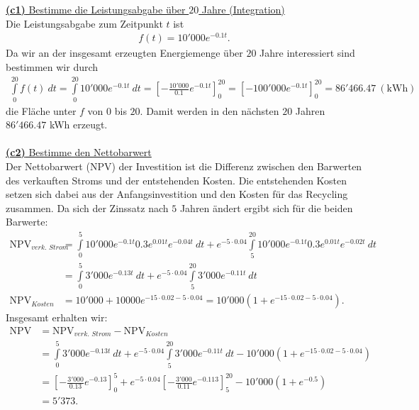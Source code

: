 \underline{\textbf{(c1)} Bestimme die Leistungsabgabe über $20$ Jahre (Integration)}\\
Die Leistungsabgabe zum Zeitpunkt $t$ ist 
\begin{align*}
	f(t) = 10'000 e^{-0.1 t}.
\end{align*}
Da wir an der insgesamt erzeugten Energiemenge über $20$ Jahre interessiert sind bestimmen wir durch
\begin{align*}
	\int 
	\limits_{0}^{20}
	f(t)
	\ dt 
	= 
	\int 
	\limits_{0}^{20}
	10'000 e^{-0.1 t}
	\ dt 
	= 
	\left[-\frac{10'000}{0.1} e^{-0.1 t}\right]_0^20
	= 
	\left[-100'000 e^{-0.1 t}\right]_0^20
	= 
	86'466.47 \ \mathrm{(kWh)}
\end{align*}
die Fläche unter $f$ von $0$ bis $20$.
Damit werden in den nächsten $20$ Jahren $86'466.47 $ kWh erzeugt.\\
\\
\newpage
\underline{\textbf{(c2)} Bestimme den Nettobarwert}\\
Der Nettobarwert ($\mathrm{NPV}$) der Investition ist die Differenz zwischen den Barwerten des verkauften Stroms und der entstehenden Kosten.
Die entstehenden Kosten setzen sich dabei aus der Anfangsinvestition und den Kosten für das Recycling zusammen.
Da sich der Zinssatz nach $5$ Jahren ändert ergibt sich für die beiden Barwerte:
\begin{align*}
	\mathrm{NPV}_{\textit{verk. Strom}}
	&=
	\int \limits_{0}^5 
	10'000 e^{-0.1 t} 0.3 e^{0.01t} e^{-0.04t} \ dt
	+
	e^{-5 \cdot 0.04}
	\int \limits_{5}^{20}
	10'000 e^{-0.1 t} 0.3 e^{0.01t} e^{-0.02t} \ dt\\
	&=
	\int \limits_{0}^5 
	3'000 e^{-0.13 t}  \ dt
	+
	e^{-5 \cdot 0.04}
	\int \limits_{5}^{20}
	3'000 e^{-0.11 t} \ dt\\
	\mathrm{NPV}_{\textit{Kosten}}
	&=
	10'000 + 10000 e^{-15 \cdot 0.02 - 5 \cdot 0.04}
	= 
	10'000 ( 1 + e^{-15 \cdot 0.02 - 5 \cdot 0.04}). 
\end{align*}
Insgesamt erhalten wir:
\begin{align*}
	\mathrm{NPV} &= 
	\mathrm{NPV}_{\textit{verk. Strom}} - \mathrm{NPV}_{\textit{Kosten}}\\
	&=
	\int \limits_{0}^5 
	3'000 e^{-0.13 t}  \ dt
	+
	e^{-5 \cdot 0.04}
	\int \limits_{5}^{20}
	3'000 e^{-0.11 t} \ dt
	-
	10'000 ( 1 + e^{-15 \cdot 0.02 - 5 \cdot 0.04})\\
	&=
	\left[-\frac{3'000}{0.13} e^{-0.13}\right]_0^5
	+
	e^{-5 \cdot 0.04}
	\left[-\frac{3'000}{0.11} e^{-0.113}\right]_5^{20}
	-
	10'000 ( 1 + e^{-0.5})\\
	&=
	5'373.
\end{align*}

\newpage

